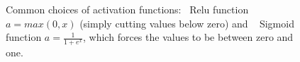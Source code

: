 \begin{figure}
\centering
{}
\caption{Common choices of activation functions:~ Relu function $a=max(0,x)$ (simply cutting values below zero) and ~ Sigmoid function $a=\frac{1}{1+e^{x}}$, which forces the values to be between zero and one.}
\label{fig:activation}
\end{figure}
